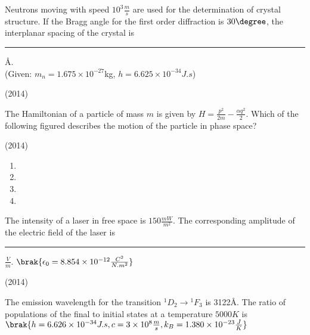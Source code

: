 \iffalse
	\chapter{2014}
	\author{AI24BTECH11003}
	\section{ph}
\fi

    \item Neutrons moving with speed $10^3\frac{m}{s}$ are used for the determination of crystal structure. If the Bragg angle for the first order diffraction is $30\degree$, the interplanar spacing of the crystal is \rule{1cm}{0.15mm} \AA.\\
    (Given: $m_n=1.675\times10^{-27}$kg, $h=6.625\times10^{-34}J.s$)
    
    \hfill{(2014)}

    \item The Hamiltonian of a particle of mass $m$ is given by $H=\frac{p^2}{2m}-\frac{\alpha q^2}{2}$. Which of the following figured describes the motion of the particle in phase space?
    
    \hfill{(2014)}

        \begin{multicols}{2}
            \begin{enumerate}
                \item 
                \item 
                \item 
                \item 
            \end{enumerate}
        \end{multicols}

    \item The intensity of a laser in free space is $150\frac{mW}{m^2}$. The corresponding amplitude of the electric field of the laser is \rule{1cm}{0.15mm}$\frac{V}{m}$. $\brak{\epsilon_0=8.854\times10^{-12}\frac{C^2}{N.m^2}}$
    
    \hfill{(2014)}


    \item The emission wavelength for the transition $^1D_2\rightarrow {^1F_3}$ is 3122\AA. The ratio of populations of the final to initial states at a temperature $5000K$ is\\ $\brak{h=6.626\times10^{-34}J.s, c=3\times10^8\frac{m}{s}, k_B=1.380\times10^{-23}\frac{J}{K}}$
    
